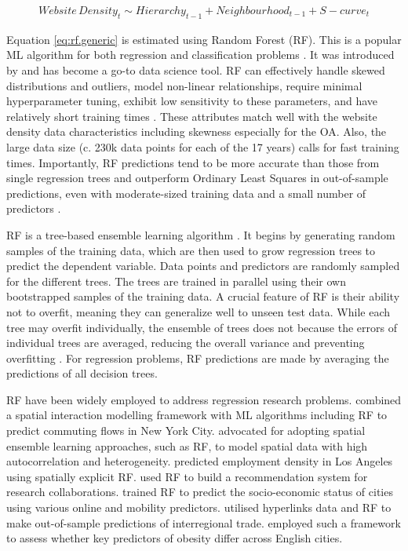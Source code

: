 \documentclass[
  authoryear,
  preprint,
  3p]{elsarticle}
\begin{document}
\begin{align}
Website\,Density_{t} \sim Hierarchy_{t-1} + Neighbourhood_{t-1} + S-curve_{t}\label{eq:rf.generic}
\end{align}

\noindent Equation \ref{eq:rf.generic} is estimated using Random Forest
(RF). This is a popular ML algorithm for both regression and
classification problems \citep{biau2012analysis}. It was introduced by
\citet{breiman2001random} and has become a go-to data science tool. RF
can effectively handle skewed distributions and outliers, model
non-linear relationships, require minimal hyperparameter tuning, exhibit
low sensitivity to these parameters, and have relatively short training
times \citep{Caruana2008, liaw2002classification, yan2020using}. These
attributes match well with the website density data characteristics
including skewness especially for the OA. Also, the large data size (c.
230k data points for each of the 17 years) calls for fast training
times. Importantly, RF predictions tend to be more accurate than those
from single regression trees and outperform Ordinary Least Squares in
out-of-sample predictions, even with moderate-sized training data and a
small number of predictors
\citep{mullainathan2017machine, athey2019machine, sulaiman2011intelligent, pourebrahim2019trip, biau2012analysis}.

RF is a tree-based ensemble learning algorithm
\citep{breiman2001random}. It begins by generating random samples of the
training data, which are then used to grow regression trees to predict
the dependent variable. Data points and predictors are randomly sampled
for the different trees. The trees are trained in parallel using their
own bootstrapped samples of the training data. A crucial feature of RF
is their ability not to overfit, meaning they can generalize well to
unseen test data. While each tree may overfit individually, the ensemble
of trees does not because the errors of individual trees are averaged,
reducing the overall variance and preventing overfitting
\citep{last2002improving}. For regression problems, RF predictions are
made by averaging the predictions of all decision trees.

RF have been widely employed to address regression research problems.
\citet{pourebrahim2019trip} combined a spatial interaction modelling
framework with ML algorithms including RF to predict commuting flows in
New York City. \citet{sinha2019assessing} advocated for adopting spatial
ensemble learning approaches, such as RF, to model spatial data with
high autocorrelation and heterogeneity. \citet{creditspatial} predicted
employment density in Los Angeles using spatially explicit RF.
\citet{guns2014recommending} used RF to build a recommendation system
for research collaborations. \citet{ren2019predicting} trained RF to
predict the socio-economic status of cities using various online and
mobility predictors. \citet{tranos2023using} utilised hyperlinks data
and RF to make out-of-sample predictions of interregional trade.
\citet{zhou2023geography} employed such a framework to assess whether
key predictors of obesity differ across English cities.
\end{document}
